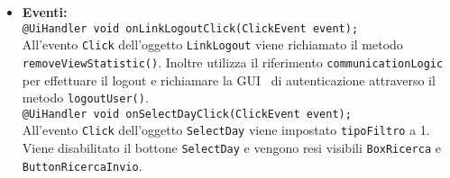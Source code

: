 {\begin{sloppypar}
{\begin{itemize}
\begin{itemize}
					\texttt{+ void setListData(Vector<Vector<String>> list);}\\
					Popola la tabella con le statistiche i dati contenuti nel parametro \texttt{list}.\\
					
					\texttt{+ void errorView(String error);}\\
					Rende visibile il messaggio di errore.\\
					
					\texttt{+ void loadListBox(Vector<String> users);}\\
					Inserisce gli utenti registrati contenuti nel vettore \texttt{users} all’interno del pannello \texttt{ListBox}.\\
					
					\texttt{+ void setUsenameLabel(String username);}\\
					Imposta l'etichetta \texttt{LabelUser} con il nome dell'amministratore autenticato.\\
					
					\texttt{+ void windowClosing();}\\
					Gestisce l'evento di chiusura della finestra della GUI\g~ di visualizzazione delle statistiche effettuando il logout.\\
					
					\texttt{- void tabella();}\\
					Metodo per la creazione delle colonne di \texttt{cellTable}.\\
				
				\item[] \textbf{Eventi:}\\
					\texttt{@UiHandler void onLinkLogoutClick(ClickEvent event);}\\
					All'evento \texttt{Click} dell'oggetto \texttt{LinkLogout} viene richiamato il metodo \texttt{removeViewStatistic()}. Inoltre utilizza il riferimento \texttt{communicationLogic} per effettuare il logout e richiamare la GUI\g~ di autenticazione attraverso il metodo \texttt{logoutUser()}.\\
					
					\texttt{@UiHandler void onSelectDayClick(ClickEvent event);}\\
					All'evento \texttt{Click} dell'oggetto \texttt{SelectDay} viene impostato \texttt{tipoFiltro} a 1. Viene disabilitato il bottone \texttt{SelectDay} e vengono resi visibili \texttt{BoxRicerca} e \texttt{ButtonRicercaInvio}.\\
					

\end{itemize}
\end{itemize}}
\end{sloppypar}}
